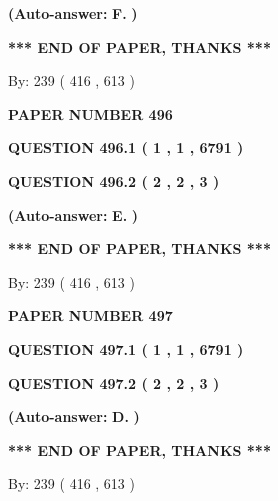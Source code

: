 \documentclass[12pt]{article}
\begin{document}
 
{\textbf{(Auto-answer:}}
{\textbf{\large{
F.}}}
{\textbf{)}}
 
 
   
   
   
   
\vspace{1.0in} 
{\textbf{\large{ *** END OF PAPER, THANKS *** }}} 
   
   
\hspace{1.0in} By: 
 239 ( 416 ,  613 )
   
   
   
   
\newpage 
\setcounter{page}{ 
   496001 } 
   
   
 {\textbf{ \Large{ PAPER NUMBER  496  }}}
   
   
   
   
  
  
{\textbf{\large{QUESTION
496.1 
 ( 1 , 1 , 6791 )
}}}
  
  
{\textbf{\large{QUESTION
496.2 
 ( 2 , 2 , 3 )
}}}
 
 
{\textbf{(Auto-answer:}}
{\textbf{\large{
E.}}}
{\textbf{)}}
 
 
   
   
   
   
\vspace{1.0in} 
{\textbf{\large{ *** END OF PAPER, THANKS *** }}} 
   
   
\hspace{1.0in} By: 
 239 ( 416 ,  613 )
   
   
   
   
\newpage 
\setcounter{page}{ 
   497001 } 
   
   
 {\textbf{ \Large{ PAPER NUMBER  497  }}}
   
   
   
   
  
  
{\textbf{\large{QUESTION
497.1 
 ( 1 , 1 , 6791 )
}}}
  
  
{\textbf{\large{QUESTION
497.2 
 ( 2 , 2 , 3 )
}}}
 
 
{\textbf{(Auto-answer:}}
{\textbf{\large{
D.}}}
{\textbf{)}}
 
 
   
   
   
   
\vspace{1.0in} 
{\textbf{\large{ *** END OF PAPER, THANKS *** }}} 
   
   
\hspace{1.0in} By: 
 239 ( 416 ,  613 )
   
   
   
   
\newpage 
\setcounter{page}{ 
   498001 } 
   
\end{document}
